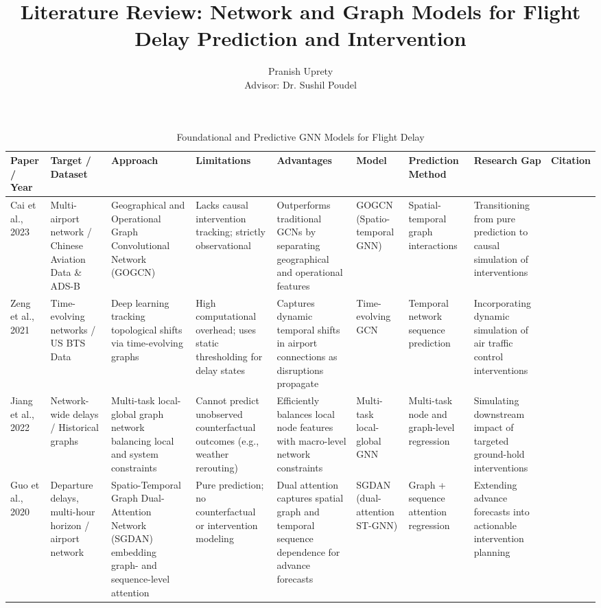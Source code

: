 \documentclass[twocolumn]{article}
\begin{document}
\title{Literature Review: Network and Graph Models for Flight Delay Prediction and Intervention}
\author{Pranish Uprety \\ Advisor: Dr. Sushil Poudel}
\date{}
\maketitle

\begin{table}[htbp]
\centering
\setlength{\tabcolsep}{0.8\tabcolsep}
\def\arraystretch{1.5}
\caption{Foundational and Predictive GNN Models for Flight Delay}

\begin{tabular}{|p{1.5cm}|p{1.5cm}|p{2.5cm}|p{2cm}|p{2cm}|p{1.5cm}|p{1.5cm}|p{1.5cm}|p{1cm}|}
\rowcolor{gray!25}
\hline
\textbf{Paper / Year} & \textbf{Target / Dataset} & \textbf{Approach} & \textbf{Limitations} & \textbf{Advantages} & \textbf{Model} & \textbf{Prediction Method} & \textbf{Research Gap} & \textbf{Citation} \\
\hline
Cai et al., 2023 & Multi-airport network / Chinese Aviation Data \& ADS-B & Geographical and Operational Graph Convolutional Network (GOGCN) & Lacks causal intervention tracking; strictly observational & Outperforms traditional GCNs by separating geographical and operational features & GOGCN (Spatio-temporal GNN) & Spatial-temporal graph interactions & Transitioning from pure prediction to causal simulation of interventions & \cite{cai2023}\\
\hline
Zeng et al., 2021 & Time-evolving networks / US BTS Data & Deep learning tracking topological shifts via time-evolving graphs & High computational overhead; uses static thresholding for delay states & Captures dynamic temporal shifts in airport connections as disruptions propagate & Time-evolving GCN & Temporal network sequence prediction & Incorporating dynamic simulation of air traffic control interventions & \cite{zeng2021}\\
\hline
Jiang et al., 2022 & Network-wide delays / Historical graphs & Multi-task local-global graph network balancing local and system constraints & Cannot predict unobserved counterfactual outcomes (e.g., weather rerouting) & Efficiently balances local node features with macro-level network constraints & Multi-task local-global GNN & Multi-task node and graph-level regression & Simulating downstream impact of targeted ground-hold interventions & \cite{jiang2022}\\
\hline
Guo et al., 2020 & Departure delays, multi-hour horizon / airport network & Spatio-Temporal Graph Dual-Attention Network (SGDAN) embedding graph- and sequence-level attention & Pure prediction; no counterfactual or intervention modeling & Dual attention captures spatial graph and temporal sequence dependence for advance forecasts & SGDAN (dual-attention ST-GNN) & Graph + sequence attention regression & Extending advance forecasts into actionable intervention planning & \cite{guo2020}\\

\end{tabular}
\end{table}
\end{document}

